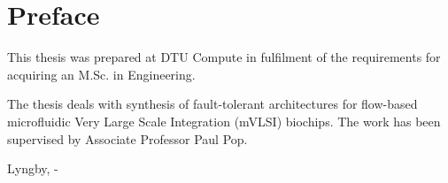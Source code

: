 \chapter{Preface}

This thesis was prepared at DTU Compute in fulfilment of the requirements for acquiring an M.Sc. in Engineering.

The thesis deals with synthesis of fault-tolerant architectures for flow-based microfluidic Very Large Scale Integration (mVLSI) biochips. The work has been supervised by Associate Professor Paul Pop.
\vspace{20mm}
\begin{center}
    \hspace{20mm} Lyngby, \thesishandin-\thesisyear
    \vspace{5mm}
    \newline
  \thesisauthor
\end{center}
